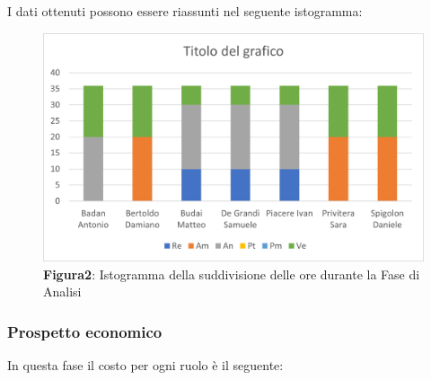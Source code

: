 I dati ottenuti possono essere riassunti nel seguente istogramma:
\begin{figure}[H]
	\centering
	\includegraphics[width=0.7\linewidth]{res/images/Figura2.png}
	\caption*{\textbf{Figura2}: Istogramma della suddivisione delle ore durante la Fase di Analisi}
	\label{fig:Figura2}
\end{figure}

\subsubsection{Prospetto economico}
In questa fase il costo per ogni ruolo è il seguente:

